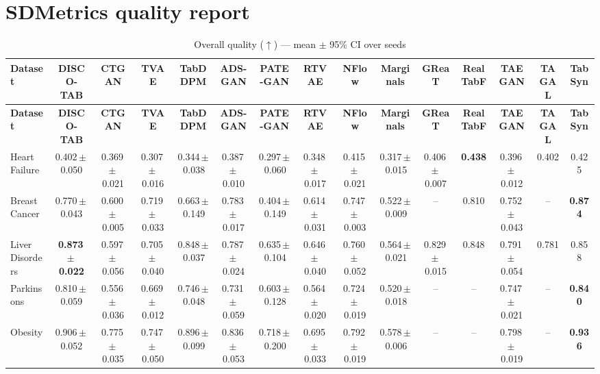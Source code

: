 \documentclass[8pt]{extarticle}
\begin{document}
\section*{SDMetrics quality report}
\begin{longtable}{l*{14}{c}}
\caption{Overall quality ($\uparrow$) --- mean $\pm$ 95\% CI over seeds}\\
\toprule
\textbf{Dataset} & \textbf{DISCO-TAB} & \textbf{CTGAN} & \textbf{TVAE} & \textbf{TabDDPM} & \textbf{ADS-GAN} & \textbf{PATE-GAN} & \textbf{RTVAE} & \textbf{NFlow} & \textbf{Marginals} & \textbf{GReaT} & \textbf{RealTabF} & \textbf{TAEGAN} & \textbf{TAGAL} & \textbf{TabSyn} \\
\midrule
\endfirsthead
\toprule
\textbf{Dataset} & \textbf{DISCO-TAB} & \textbf{CTGAN} & \textbf{TVAE} & \textbf{TabDDPM} & \textbf{ADS-GAN} & \textbf{PATE-GAN} & \textbf{RTVAE} & \textbf{NFlow} & \textbf{Marginals} & \textbf{GReaT} & \textbf{RealTabF} & \textbf{TAEGAN} & \textbf{TAGAL} & \textbf{TabSyn} \\
\midrule
\endhead
\bottomrule
\endfoot
Heart Failure & 0.402\,$\pm$\,0.050 & 0.369\,$\pm$\,0.021 & 0.307\,$\pm$\,0.016 & 0.344\,$\pm$\,0.038 & 0.387\,$\pm$\,0.010 & 0.297\,$\pm$\,0.060 & 0.348\,$\pm$\,0.017 & 0.415\,$\pm$\,0.021 & 0.317\,$\pm$\,0.015 & 0.406\,$\pm$\,0.007 & \textbf{0.438} & 0.396\,$\pm$\,0.012 & 0.402 & 0.425 \\
Breast Cancer & 0.770\,$\pm$\,0.043 & 0.600\,$\pm$\,0.005 & 0.719\,$\pm$\,0.033 & 0.663\,$\pm$\,0.149 & 0.783\,$\pm$\,0.017 & 0.404\,$\pm$\,0.149 & 0.614\,$\pm$\,0.031 & 0.747\,$\pm$\,0.003 & 0.522\,$\pm$\,0.009 & -- & 0.810 & 0.752\,$\pm$\,0.043 & -- & \textbf{0.874} \\
Liver Disorders & \textbf{0.873\,$\pm$\,0.022} & 0.597\,$\pm$\,0.056 & 0.705\,$\pm$\,0.040 & 0.848\,$\pm$\,0.037 & 0.787\,$\pm$\,0.024 & 0.635\,$\pm$\,0.104 & 0.646\,$\pm$\,0.040 & 0.760\,$\pm$\,0.052 & 0.564\,$\pm$\,0.021 & 0.829\,$\pm$\,0.015 & 0.848 & 0.791\,$\pm$\,0.054 & 0.781 & 0.858 \\
Parkinsons & 0.810\,$\pm$\,0.059 & 0.556\,$\pm$\,0.036 & 0.669\,$\pm$\,0.012 & 0.746\,$\pm$\,0.048 & 0.731\,$\pm$\,0.059 & 0.603\,$\pm$\,0.128 & 0.564\,$\pm$\,0.020 & 0.724\,$\pm$\,0.019 & 0.520\,$\pm$\,0.018 & -- & -- & 0.747\,$\pm$\,0.021 & -- & \textbf{0.840} \\
Obesity & 0.906\,$\pm$\,0.052 & 0.775\,$\pm$\,0.035 & 0.747\,$\pm$\,0.050 & 0.896\,$\pm$\,0.099 & 0.836\,$\pm$\,0.053 & 0.718\,$\pm$\,0.200 & 0.695\,$\pm$\,0.033 & 0.792\,$\pm$\,0.019 & 0.578\,$\pm$\,0.006 & -- & -- & 0.798\,$\pm$\,0.019 & -- & \textbf{0.936} \\

\end{longtable}
\end{document}
